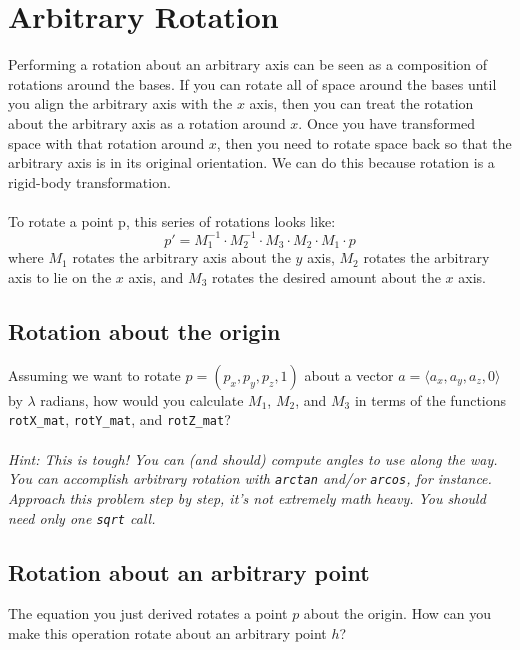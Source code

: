 \documentclass[10pt,twocolumn]{article}
\begin{document}
\begin{framed}
\vspace{20em}
\end{framed}

\section{Arbitrary Rotation}
Performing a rotation about an arbitrary axis can be seen as a composition of rotations around the bases. If you can rotate all of space around the bases until you align the arbitrary axis with the $x$ axis, then you can treat the rotation about the arbitrary axis as a rotation around $x$. Once you have transformed space with that rotation around $x$, then you need to rotate space back so that the arbitrary axis is in its original orientation. We can do this because rotation is a rigid-body transformation.\\\\
To rotate a point p, this series of rotations looks like:
\[p' = M^{-1}_1\cdot M^{-1}_2 \cdot M_3 \cdot M_2 \cdot M_1 \cdot p\]
where $M_1$ rotates the arbitrary axis about the $y$ axis, $M_2$ rotates the arbitrary axis to lie on the $x$ axis, and $M_3$ rotates the desired amount about the $x$ axis.

\subsection{Rotation about the origin}
\begin{framed}
\noindent{\bf [1.5 points]} Assuming we want to rotate $p=(p_x,p_y,p_z,1)$ about a vector $a = \langle a_x,a_y,a_z,0\rangle$ by $\lambda$ radians, how would you calculate $M_1$, $M_2$, and $M_3$ in terms of the functions {\tt rotX\_mat}, {\tt rotY\_mat}, and {\tt rotZ\_mat}?\\\\
\emph{Hint: This is tough! You can (and should) compute angles to use along the way. You can accomplish arbitrary rotation with {\tt arctan} and/or {\tt arcos}, for instance. Approach this problem step by step, it's not extremely math heavy. You should need only one {\tt sqrt} call.}
\end{framed}

\begin{framed}
\vspace{20em}
\end{framed}


\subsection{Rotation about an arbitrary point}
\begin{framed}
\noindent{\bf [1 point]} The equation you just derived rotates a point $p$ about the origin. How can you make this operation rotate about an arbitrary point $h$?
\end{framed}
\end{document}
